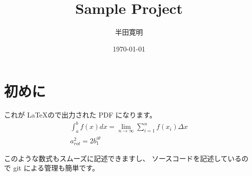 \documentclass{ltjsarticle}
\title{Sample Project}
\author{半田寛明}
\date{\today}
\begin{document}
\maketitle
\section{初めに}
これが \LaTeX ので出力された PDF になります。
\begin{eqnarray*}
    \int_a^bf(x)dx=\lim_{n \to \infty}\sum_{i = 1}^n f(x_i)\Delta x\\
    a_{rot}^2=2b_1^{i\theta}
\end{eqnarray*}

このような数式もスムーズに記述できますし、
ソースコードを記述しているので git による管理も簡単です。
\end{document}
